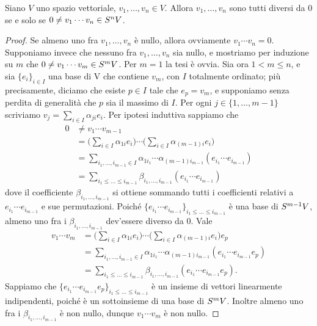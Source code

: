 \begin{proposition}
Siano $V$ uno spazio vettoriale, $v_1,\ldots, v_n\in V$. Allora $v_1,\ldots, v_n$ sono tutti diversi da $0$ se e solo se $0\neq v_1\cdots v_n\in S^nV$.
\end{proposition}
\begin{proof}
Se almeno uno fra $v_1,\ldots,v_n$ è nullo, allora ovviamente $v_1\cdots v_n=0$. Supponiamo invece che nessuno fra $v_1,\ldots,v_n$ sia nullo, e mostriamo per induzione su $m$ che $0\neq v_1\cdots v_m\in S^mV$. Per $m=1$ la tesi è ovvia. Sia ora $1<m\le n$, e sia $\{e_i\}_{i\in I}$ una base di V che contiene $v_m$, con $I$ totalmente ordinato; più precisamente, diciamo che esiste $p\in I$ tale che $e_p=v_m$, e supponiamo senza perdita di generalità che $p$ sia il massimo di $I$. Per ogni $j\in\{1,\ldots,m-1\}$ scriviamo $v_j=\sum_{i\in I}\alpha_{ji}e_i$. Per ipotesi induttiva sappiamo che
\begin{align*}
0&\neq v_1\cdots v_{m-1}\\
&=\biggl(\sum_{i\in I}\alpha_{1i}e_i\biggr)\cdots\biggl(\sum_{i\in I}\alpha_{(m-1)i}e_i\biggr)\\
&=\sum_{i_1,\ldots,i_{m-1}\in I}\alpha_{1i_1}\cdots\alpha_{(m-1)i_{m-1}}(e_{i_1}\cdots e_{i_{m-1}})\\
&=\sum_{i_1\le\ldots\le i_{m-1}}\beta_{i_1,\ldots,i_{m-1}}(e_{i_1}\cdots e_{i_{m-1}})
\end{align*}
dove il coefficiente $\beta_{i_1,\ldots,i_{m-1}}$ si ottiene sommando tutti i coefficienti relativi a $e_{i_1}\cdots e_{i_{m-1}}$ e sue permutazioni. Poiché $\{e_{i_1}\cdots e_{i_{m-1}}\}_{i_1\le\ldots\le i_{m-1}}$ è una base di $S^{m-1}V$, almeno uno fra i $\beta_{i_1,\ldots,i_{m-1}}$ dev'essere diverso da 0. Vale
\begin{align*}
v_1\cdots v_m&=\biggl(\sum_{i\in I}\alpha_{1i}e_i\biggr)\cdots\biggl(\sum_{i\in I}\alpha_{(m-1)i}e_i\biggr)e_p\\
&=\sum_{i_1,\ldots,i_{m-1}\in I}\alpha_{1i_1}\cdots\alpha_{(m-1)i_{m-1}}(e_{i_1}\cdots e_{i_{m-1}}e_p)\\
&=\sum_{i_1\le\ldots\le i_{m-1}}\beta_{i_1,\ldots,i_{m-1}}(e_{i_1}\cdots e_{i_{m-1}}e_p).
\end{align*}
Sappiamo che $\{e_{i_1}\cdots e_{i_{m-1}}e_p\}_{i_1\le\ldots\le i_{m-1}}$ è un insieme di vettori linearmente indipendenti, poiché è un sottoinsieme di una base di $S^mV$. Inoltre almeno uno fra i $\beta_{i_1,\ldots,i_{m-1}}$ è non nullo, dunque $v_1\cdots v_m$ è non nullo.
\end{proof}

